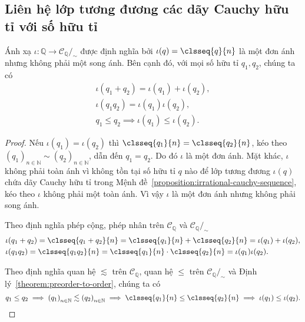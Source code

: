 \subsection{Liên hệ lớp tương đương các dãy Cauchy hữu tỉ với số hữu tỉ}

\begin{theorem}\label{theorem:embed-Q-into-quotient-set-of-rational-cauchy-sequences}
    Ánh xạ $\iota: \mathbb{Q}\to \mathscr{C}_{\mathbb{Q}}/_{\sim}$ được định nghĩa bởi $\iota(q) = \clsseq{q}{n}$ là một đơn ánh nhưng không phải một song ánh. Bên cạnh đó, với mọi số hữu tỉ $q_{1}, q_{2}$, chúng ta có
    \[
        \begin{split}
            \iota(q_{1} + q_{2}) = \iota(q_{1}) + \iota(q_{2}), \\
            \iota(q_{1}q_{2}) = \iota(q_{1})\iota(q_{2}), \\
            q_{1}\leq q_{2} \implies \iota(q_{1})\leq \iota(q_{2}).
        \end{split}
    \]
\end{theorem}

\begin{proof}
    Nếu $\iota(q_{1}) = \iota(q_{2})$ thì $\clsseq{q_{1}}{n} = \clsseq{q_{2}}{n}$, kéo theo ${(q_{1})}_{n\in\mathbb{N}}\sim {(q_{2})}_{n\in\mathbb{N}}$, dẫn đến $q_{1} = q_{2}$. Do đó $\iota$ là một đơn ánh. Mặt khác, $\iota$ không phải toàn ánh vì không tồn tại số hữu tỉ $q$ nào để lớp tương đương $\iota(q)$ chứa dãy Cauchy hữu tỉ trong Mệnh đề~\ref{proposition:irrational-cauchy-sequence}, kéo theo $\iota$ không phải một toàn ánh. Vì vậy $\iota$ là một đơn ánh nhưng không phải song ánh.

    Theo định nghĩa phép cộng, phép nhân trên $\mathscr{C}_{\mathbb{Q}}$ và $\mathscr{C}_{\mathbb{Q}}/_{\sim}$
    \begin{align*}
         & \iota(q_{1} + q_{2}) = \clsseq{q_{1} + q_{2}}{n} = \clsseq{q_{1}}{n} + \clsseq{q_{2}}{n} = \iota(q_{1}) + \iota(q_{2}), \\
         & \iota(q_{1}q_{2}) = \clsseq{q_{1}q_{2}}{n} = \clsseq{q_{1}}{n}\cdot\clsseq{q_{2}}{n} = \iota(q_{1})\iota(q_{2}).
    \end{align*}

    Theo định nghĩa quan hệ $\lesssim$ trên $\mathscr{C}_{\mathbb{Q}}$, quan hệ $\leq$ trên $\mathscr{C}_{\mathbb{Q}}/_{\sim}$ và Định lý~\ref{theorem:preorder-to-order}, chúng ta có
    \[
        q_{1}\leq q_{2} \implies {(q_{1})}_{n\in\mathbb{N}}\lesssim {(q_{2})}_{n\in\mathbb{N}} \implies \clsseq{q_{1}}{n} \leq \clsseq{q_{2}}{n} \implies \iota(q_{1}) \leq \iota(q_{2}).
    \]
\end{proof}

